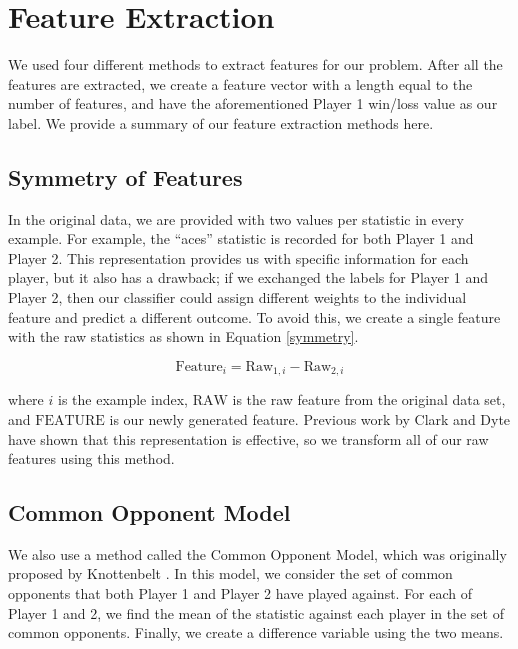\documentclass[conference]{IEEEtran}
\begin{document}
\section{Feature Extraction}
We used four different methods to extract features for our problem. After all the features are extracted, we create a feature vector with a length equal to the number of features, and have the aforementioned Player 1 win/loss value as our label. We provide a summary of our feature extraction methods here.

	\subsection{Symmetry of Features}
	In the original data, we are provided with two values per statistic in every example. For example, the ``aces'' statistic is recorded for both Player 1 and Player 2. This representation provides us with specific information for each player, but it also has a drawback; if we exchanged the labels for Player 1 and Player 2, then our classifier could assign different weights to the individual feature and predict a different outcome. To avoid this, we create a single feature with the raw statistics as shown in Equation \ref{symmetry}.

	\begin{equation} \label{symmetry}
		\text{Feature}_{i} = \text{Raw}_{1,i} - \text{Raw}_{2,i}
	\end{equation}

	where $i$ is the example index, $\text{RAW}$ is the raw feature from the original data set, and $\text{FEATURE}$ is our newly generated feature. Previous work by Clark and Dyte \cite{clark_and_dyte} have shown that this representation is effective, so we transform all of our raw features using this method.

	\subsection{Common Opponent Model}
		We also use a method called the Common Opponent Model, which was originally proposed by Knottenbelt \cite{common_opponent_model}. In this model, we consider the set of common opponents that both Player 1 and Player 2 have played against. For each of Player 1 and 2, we find the mean of the statistic against each player in the set of common opponents. Finally, we create a difference variable using the two means. 
\end{document}
